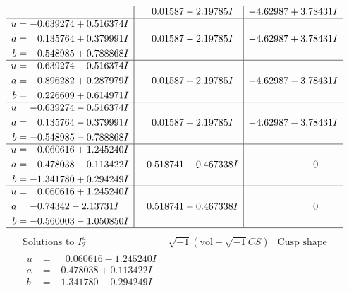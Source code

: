 \documentclass[1p]{elsarticle_modified}
\theoremstyle{definition}
\newcommand{\I}{\sqrt{-1}}
\begin{document}
$$\begin{array}{c|c|c}
 & \phantom{-}0.01587 - 2.19785 I & -4.62987 + 3.78431 I \\ \hline\begin{aligned}
u &= -0.639274 + 0.516374 I \\
a &= \phantom{-}0.135764 + 0.379991 I \\
b &= -0.548985 + 0.788868 I\end{aligned}
 & \phantom{-}0.01587 - 2.19785 I & -4.62987 + 3.78431 I \\ \hline\begin{aligned}
u &= -0.639274 - 0.516374 I \\
a &= -0.896282 + 0.287979 I \\
b &= \phantom{-}0.226609 + 0.614971 I\end{aligned}
 & \phantom{-}0.01587 + 2.19785 I & -4.62987 - 3.78431 I \\ \hline\begin{aligned}
u &= -0.639274 - 0.516374 I \\
a &= \phantom{-}0.135764 - 0.379991 I \\
b &= -0.548985 - 0.788868 I\end{aligned}
 & \phantom{-}0.01587 + 2.19785 I & -4.62987 - 3.78431 I \\ \hline\begin{aligned}
u &= \phantom{-}0.060616 + 1.245240 I \\
a &= -0.478038 - 0.113422 I \\
b &= -1.341780 + 0.294249 I\end{aligned}
 & \phantom{-}0.518741 - 0.467338 I & \phantom{-0.000000 } 0 \\ \hline\begin{aligned}
u &= \phantom{-}0.060616 + 1.245240 I \\
a &= -0.74342 - 2.13731 I \\
b &= -0.560003 - 1.050850 I\end{aligned}
 & \phantom{-}0.518741 - 0.467338 I & \phantom{-0.000000 } 0\\
 \hline 
 \end{array}$$\newpage$$\begin{array}{c|c|c}  
\text{Solutions to }I^u_{2}& \I (\text{vol} + \sqrt{-1}CS) & \text{Cusp shape}\\
 \hline 
\begin{aligned}
u &= \phantom{-}0.060616 - 1.245240 I \\
a &= -0.478038 + 0.113422 I \\
b &= -1.341780 - 0.294249 I\end{aligned}

\end{array}$$
\end{document}
